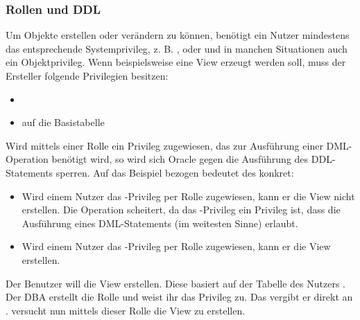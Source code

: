         \subsubsection{Rollen und DDL}
          \label{rolesandddl}
          Um Objekte erstellen oder ver\"andern zu k\"onnen, ben\"otigt ein Nutzer mindestens das entsprechende Systemprivileg, z. B. ,  oder  und in manchen Situationen auch ein Objektprivileg. Wenn beispielsweise eine View erzeugt werden soll, muss der Ersteller folgende Privilegien besitzen:
          \begin{itemize}
            \item {}
            \item {} auf die Basistabelle
          \end{itemize}
          Wird mittels einer Rolle ein Privileg zugewiesen, das zur Ausf\"uhrung einer DML-Operation ben\"otigt wird, so wird sich Oracle gegen die Ausf\"uhrung des DDL-Statements sperren. Auf das Beispiel bezogen bedeutet des konkret:
          \begin{itemize}
            \item Wird einem Nutzer das -Privileg per Rolle zugewiesen, kann er die View nicht erstellen. Die Operation scheitert, da das -Privileg ein Privileg ist, dass die Ausf\"uhrung eines DML-Statements (im weitesten Sinne) erlaubt.
            \item Wird einem Nutzer das -Privileg per Rolle zugewiesen, kann er die View erstellen.
          \end{itemize}
          Der Benutzer  will die View  erstellen. Diese basiert auf der Tabelle  des Nutzers . Der DBA erstellt die Rolle  und weist ihr das Privileg  zu. Das  vergibt er direkt an .  versucht nun mittels dieser Rolle die View zu erstellen.

